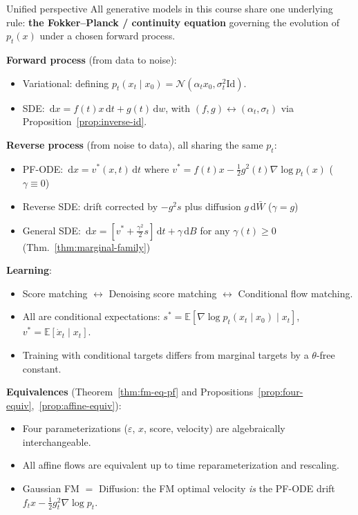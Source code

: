 \documentclass[11pt]{article}
\newcommand{\E}{\mathbb{E}}
\newcommand{\cN}{\mathcal{N}}
\newcommand{\grad}{\nabla}
\newcommand{\Id}{\mathrm{Id}}
\newcommand{\dd}{\,\mathrm{d}}
\theoremstyle{definition}
\theoremstyle{remark}
\begin{document}
\begin{summarybox}{Unified perspective}
All generative models in this course share one underlying rule: \textbf{the Fokker--Planck / continuity equation} governing the evolution of $p_t(x)$ under a chosen forward process.

\medskip
\textbf{Forward process} (from data to noise):
\begin{itemize}[nosep]
\item Variational: defining $p_t(x_t\mid x_0) = \cN(\alpha_t x_0, \sigma_t^2\Id)$.
\item SDE: $\dd x = f(t)x\dd t + g(t)\dd w$, with $(f,g) \leftrightarrow (\alpha_t,\sigma_t)$ via Proposition~\ref{prop:inverse-id}.
\end{itemize}

\medskip
\textbf{Reverse process} (from noise to data), all sharing the same $p_t$:
\begin{itemize}[nosep]
\item PF-ODE: $\dd x = v^*(x,t)\dd t$ where $v^* = f(t)x - \frac{1}{2}g^2(t)\grad\log p_t(x)$ \hfill ($\gamma\equiv 0$)
\item Reverse SDE: drift corrected by $-g^2 s$ plus diffusion $g\dd\bar{W}$ \hfill ($\gamma = g$)
\item General SDE: $\dd x = [v^* + \frac{\gamma^2}{2}s]\dd t + \gamma\dd B$ for any $\gamma(t)\ge 0$ \hfill (Thm.~\ref{thm:marginal-family})
\end{itemize}

\medskip
\textbf{Learning}:
\begin{itemize}[nosep]
\item Score matching $\leftrightarrow$ Denoising score matching $\leftrightarrow$ Conditional flow matching.
\item All are conditional expectations: $s^* = \E[\grad\log p_t(x_t\mid x_0)\mid x_t]$, $v^* = \E[\dot{x}_t\mid x_t]$.
\item Training with conditional targets differs from marginal targets by a $\theta$-free constant.
\end{itemize}

\medskip
\textbf{Equivalences} (Theorem~\ref{thm:fm-eq-pf} and Propositions~\ref{prop:four-equiv},~\ref{prop:affine-equiv}):
\begin{itemize}[nosep]
\item Four parameterizations ($\varepsilon$, $x$, score, velocity) are algebraically interchangeable.
\item All affine flows are equivalent up to time reparameterization and rescaling.
\item Gaussian FM $=$ Diffusion: the FM optimal velocity \emph{is} the PF-ODE drift $f_t x - \frac{1}{2}g_t^2\grad\log p_t$.
\end{itemize}
\end{summarybox}
\end{document}

